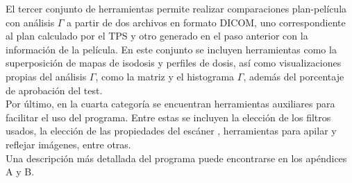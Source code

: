 El tercer conjunto de herramientas permite realizar comparaciones plan-película con análisis $\Gamma$ a partir de dos archivos en formato DICOM, uno correspondiente al plan calculado por el TPS y otro generado en el paso anterior con la información de la película. En este conjunto se incluyen herramientas como la superposición de mapas de isodosis y perfiles de dosis, así como visualizaciones propias del análisis $\Gamma$, como la matriz y el histograma $\Gamma$, además del porcentaje de aprobación del test.\\

Por último, en la cuarta categoría se encuentran herramientas auxiliares para facilitar el uso del programa. Entre estas se incluyen la elección de los filtros usados, la elección de las propiedades del escáner , herramientas para apilar y reflejar imágenes, entre otras.\\

Una descripción más detallada del programa puede encontrarse en los apéndices A y B.





  











